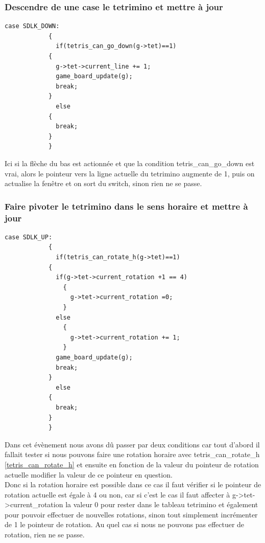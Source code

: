 \documentclass[a4paper,10p]{report}
\begin{document}
\subsubsection{Descendre de une case le tetrimino et mettre à jour}
\label{down}
\begin{lstlisting}
case SDLK_DOWN:
		    {
		      if(tetris_can_go_down(g->tet)==1)
			{
			  g->tet->current_line += 1;
			  game_board_update(g);
			  break;
			}
		      else
			{
			  break;
			}
		    }
\end{lstlisting}
Ici si la flèche du bas est actionnée et que la condition tetris\_can\_go\_down est vrai, alors le pointeur vers la ligne actuelle du tetrimino augmente de 1, puis on actualise la fenêtre et on sort du switch, sinon rien ne se passe.

\subsubsection{Faire pivoter le tetrimino dans le sens horaire et mettre à jour}
\label{rotate_h}
\begin{lstlisting}
case SDLK_UP:
		    {
		      if(tetris_can_rotate_h(g->tet)==1)
			{
			  if(g->tet->current_rotation +1 == 4)
			    {
			      g->tet->current_rotation =0;
			    }
			  else
			    {
			      g->tet->current_rotation += 1;
			    }
			  game_board_update(g);
			  break;
			}
		      else
			{
			  break;
			}
		    }
\end{lstlisting}
Dans cet évènement nous avons dû passer par deux conditions car tout d'abord il fallait tester si nous pouvons faire une rotation horaire avec tetris\_can\_rotate\_h \ref{tetris_can_rotate_h} et ensuite en fonction de la valeur du pointeur de rotation actuelle modifier la valeur de ce pointeur en question.
\\Donc si la rotation horaire est possible dans ce cas il faut vérifier si le pointeur de rotation actuelle est égale à 4 ou non, car si c'est le cas il faut affecter à g->tet->current\_rotation la valeur 0 pour rester dans le tableau tetrimino et également pour pouvoir effectuer de nouvelles rotations, sinon tout simplement incrémenter de 1 le pointeur de rotation. Au quel cas si nous ne pouvons pas effectuer de rotation, rien ne se passe.
\end{document}
